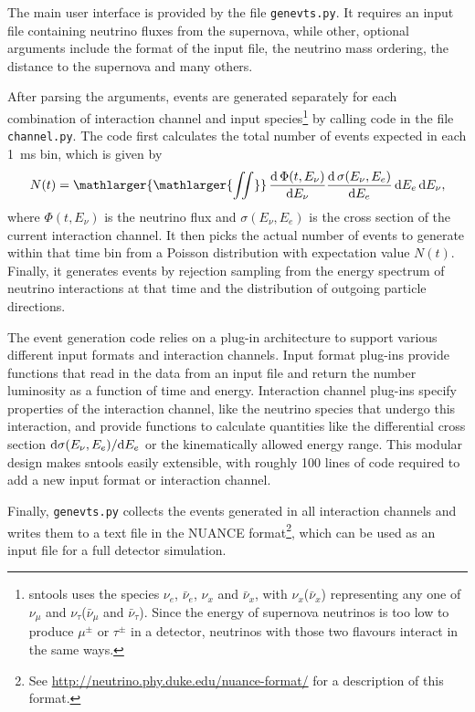 \documentclass[11pt, oneside]{article}
\renewcommand{\d}{\mathrm{d}}
\newcommand{\tdiff}[3][\empty]{\ifx\empty#1
		\frac{\d\,#2}{\d #3}
	\else
		\frac{\d^{#1}\,#2}{\d #3^{#1}}
	\fi} %
\newcommand{\tdiffx}[3][\empty]{\ifx\empty#1
		\d #2 / \d #3
	\else
		\d^{#1} #2 / \d #3^{#1}
	\fi} %
\newcommand{\nue}{\ensuremath{\nu_e}\xspace}
\newcommand{\numu}{\ensuremath{\nu_\mu}\xspace}
\newcommand{\nutau}{\ensuremath{\nu_\tau}\xspace}
\newcommand{\nux}{\ensuremath{\nu_x}\xspace}
\newcommand{\nuebar}{\ensuremath{\bar{\nu}_e}\xspace}
\newcommand{\numubar}{\ensuremath{\bar{\nu}_\mu}\xspace}
\newcommand{\nutaubar}{\ensuremath{\bar{\nu}_\tau}\xspace}
\newcommand{\nuxbar}{\ensuremath{\bar{\nu}_x}\xspace}
\begin{document}
The main user interface is provided by the file \texttt{genevts.py}.
It requires an input file containing neutrino fluxes from the supernova, while other, optional arguments include the format of the input file, the neutrino mass ordering, the distance to the supernova and many others.

After parsing the arguments, events are generated separately for each combination of interaction channel and input species\footnote{sntools uses the species \nue, \nuebar, \nux and \nuxbar, with \nux (\nuxbar) representing any one of \numu and \nutau (\numubar and \nutaubar). Since the energy of supernova neutrinos is too low to produce $\mu^\pm$ or $\tau^\pm$ in a detector, neutrinos with those two flavours interact in the same ways.} by calling code in the file \texttt{channel.py}.
The code first calculates the total number of events expected in each \SI{1}{ms} bin, which is given by
\begin{equation}
N(t) = \mathop{\mathlarger{\mathlarger{\iint}}} \tdiff{\Phi (t, E_\nu)}{E_\nu} \tdiff{\sigma (E_\nu, E_e)}{E_e}\, \d E_e\,\d E_\nu,
\end{equation}
where $\Phi (t, E_\nu)$ is the neutrino flux and $\sigma (E_\nu, E_e)$ is the cross section of the current interaction channel.
It then picks the actual number of events to generate within that time bin from a Poisson distribution with expectation value $N(t)$.
Finally, it generates events by rejection sampling from the energy spectrum of neutrino interactions at that time and the distribution of outgoing particle directions.

The event generation code relies on a plug-in architecture to support various different input formats and interaction channels.
Input format plug-ins provide functions that read in the data from an input file and return the number luminosity as a function of time and energy.
Interaction channel plug-ins specify properties of the interaction channel, like the neutrino species that undergo this interaction, and provide functions to calculate quantities like the differential cross section $\tdiffx{\sigma (E_\nu, E_e)}{E_e}$ or the kinematically allowed energy range.
This modular design makes sntools easily extensible, with roughly 100 lines of code required to add a new input format or interaction channel.

Finally, \texttt{genevts.py} collects the events generated in all interaction channels and writes them to a text file in the NUANCE format\footnote{See \url{http://neutrino.phy.duke.edu/nuance-format/} for a description of this format.}, which can be used as an input file for a full detector simulation.
\end{document}
